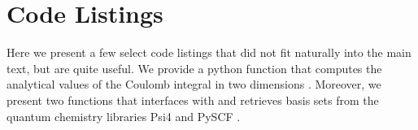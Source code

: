 \chapter{Code Listings}

Here we present a few select code listings that did not fit naturally into the 
main text, but are quite useful. We provide a python function that computes the 
analytical values of the Coulomb integral in two
dimensions \cite{anisimovas1998energy}. Moreover, we present two 
functions that interfaces with and retrieves basis sets from the quantum chemistry
libraries Psi4 \cite{parrish2017psi4} and PySCF \cite{PYSCF}.





\clearemptydoublepage